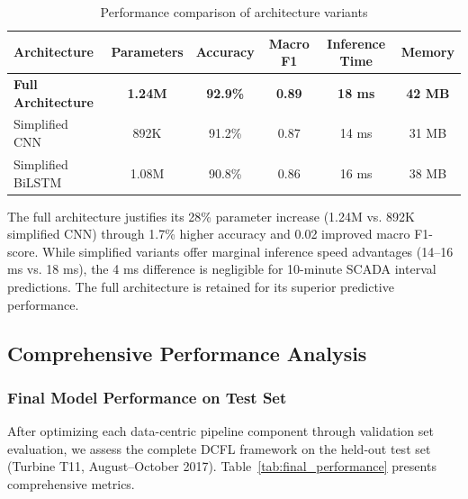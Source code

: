 \documentclass[12pt]{article}
\begin{document}
\begin{table}[htbp]
\centering
\caption{Performance comparison of architecture variants}
\label{tab:architecture_comparison}
\begin{tabular}{lccccc}
\toprule
\textbf{Architecture} & \textbf{Parameters} & \textbf{Accuracy} & \textbf{Macro F1} & \textbf{Inference Time} & \textbf{Memory} \\
\midrule
\textbf{Full Architecture} & \textbf{1.24M} & \textbf{92.9\%} & \textbf{0.89} & \textbf{18 ms} & \textbf{42 MB} \\
Simplified CNN & 892K & 91.2\% & 0.87 & 14 ms & 31 MB \\
Simplified BiLSTM & 1.08M & 90.8\% & 0.86 & 16 ms & 38 MB \\
\bottomrule
\end{tabular}
\end{table}

The full architecture justifies its 28\% parameter increase (1.24M vs. 892K simplified CNN) through 1.7\% higher accuracy and 0.02 improved macro F1-score. While simplified variants offer marginal inference speed advantages (14--16 ms vs. 18 ms), the 4 ms difference is negligible for 10-minute SCADA interval predictions. The full architecture is retained for its superior predictive performance.

\subsection{Comprehensive Performance Analysis}

\subsubsection{Final Model Performance on Test Set}

After optimizing each data-centric pipeline component through validation set evaluation, we assess the complete DCFL framework on the held-out test set (Turbine T11, August--October 2017). Table~\ref{tab:final_performance} presents comprehensive metrics.
\end{document}
